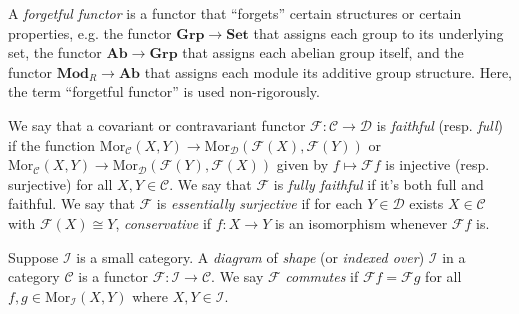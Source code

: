 \documentclass[11pt]{book}
\begin{document}
\begin{example}A \textit{forgetful functor} is a functor that ``forgets'' certain structures or certain properties, e.g. the functor $\mathbf{Grp}\rightarrow\mathbf{Set}$ that assigns each group to its underlying set, the functor $\mathbf{Ab}\rightarrow \mathbf{Grp}$ that assigns each abelian group itself, and the functor $\mathbf{Mod}_R\rightarrow \mathbf{Ab}$ that assigns each module its additive group structure. Here, the term ``forgetful functor'' is used non-rigorously.
\end{example}
\begin{definition}We say that a covariant or contravariant functor $\mathscr{F}:\mathcal C\rightarrow \mathcal D$ is \textit{faithful} (resp. \textit{full}) if the function 
$\mathrm{Mor}_{\mathcal C}(X,Y)\rightarrow\mathrm{Mor}_{\mathcal D}(\mathscr F(X),\mathscr F(Y))$ or $\mathrm{Mor}_{\mathcal C}(X,Y)\rightarrow\mathrm{Mor}_{\mathcal D}(\mathscr F(Y),\mathscr F(X))$ given by $f\mapsto \mathscr{F}f$ is injective (resp. surjective) for all $X,Y\in\mathcal C$. We say that $\mathscr{F}$ is \textit{fully faithful} if it's both full and faithful. We say that $\mathscr{F}$ is \textit{essentially surjective} if for each $Y\in\mathcal D$ exists $X\in\mathcal C$ with $\mathscr{F}(X)\cong Y$, \textit{conservative} if $f:X\rightarrow Y$ is an isomorphism whenever $\mathscr Ff$ is.
\end{definition}
\begin{definition}Suppose $\mathcal I$ is a small category. A \textit{diagram} of \textit{shape} (or \textit{indexed over}) $\mathcal I$ in a category $\mathcal C$ is a functor $\mathscr{F}:\mathcal I\rightarrow \mathcal C$. We say $\mathscr{F}$ \textit{commutes} if $\mathscr Ff=\mathscr{F}g$ for all $f,g\in\mathrm{Mor}_{\mathcal I}(X,Y)$ where $X,Y\in\mathcal I$.
\end{definition}
\end{document}
